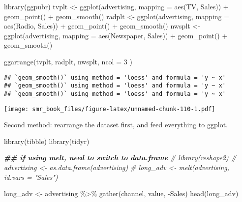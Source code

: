 \documentclass[
  oneside]{book}
\newenvironment{Shaded}{\begin{snugshade}}{\end{snugshade}}
\newcommand{\AttributeTok}[1]{\textcolor[rgb]{0.77,0.63,0.00}{#1}}
\newcommand{\CommentTok}[1]{\textcolor[rgb]{0.56,0.35,0.01}{\textit{#1}}}
\newcommand{\DecValTok}[1]{\textcolor[rgb]{0.00,0.00,0.81}{#1}}
\newcommand{\DocumentationTok}[1]{\textcolor[rgb]{0.56,0.35,0.01}{\textbf{\textit{#1}}}}
\newcommand{\FunctionTok}[1]{\textcolor[rgb]{0.00,0.00,0.00}{#1}}
\newcommand{\NormalTok}[1]{#1}
\newcommand{\OtherTok}[1]{\textcolor[rgb]{0.56,0.35,0.01}{#1}}
\newcommand{\SpecialCharTok}[1]{\textcolor[rgb]{0.00,0.00,0.00}{#1}}
\begin{document}
\begin{Shaded}
\begin{Highlighting}[]
\FunctionTok{library}\NormalTok{(ggpubr)}
\NormalTok{tvplt }\OtherTok{\textless{}{-}} \FunctionTok{ggplot}\NormalTok{(advertising, }\AttributeTok{mapping =} \FunctionTok{aes}\NormalTok{(TV, Sales)) }\SpecialCharTok{+}
  \FunctionTok{geom\_point}\NormalTok{() }\SpecialCharTok{+}
  \FunctionTok{geom\_smooth}\NormalTok{()}
\NormalTok{radplt }\OtherTok{\textless{}{-}} \FunctionTok{ggplot}\NormalTok{(advertising, }\AttributeTok{mapping =} \FunctionTok{aes}\NormalTok{(Radio, Sales)) }\SpecialCharTok{+}
  \FunctionTok{geom\_point}\NormalTok{() }\SpecialCharTok{+}
  \FunctionTok{geom\_smooth}\NormalTok{()}
\NormalTok{nwsplt }\OtherTok{\textless{}{-}} \FunctionTok{ggplot}\NormalTok{(advertising, }\AttributeTok{mapping =} \FunctionTok{aes}\NormalTok{(Newspaper, Sales)) }\SpecialCharTok{+}
  \FunctionTok{geom\_point}\NormalTok{() }\SpecialCharTok{+}
  \FunctionTok{geom\_smooth}\NormalTok{()}

\FunctionTok{ggarrange}\NormalTok{(tvplt, radplt, nwsplt,}
  \AttributeTok{ncol =} \DecValTok{3}
\NormalTok{)}
\end{Highlighting}
\end{Shaded}

\begin{verbatim}
## `geom_smooth()` using method = 'loess' and formula = 'y ~ x'
## `geom_smooth()` using method = 'loess' and formula = 'y ~ x'
## `geom_smooth()` using method = 'loess' and formula = 'y ~ x'
\end{verbatim}

\texttt{[image: smr\_book\_files/figure-latex/unnamed-chunk-110-1.pdf]}

Second method: rearrange the dataset first,
and feed everything to ggplot.

\begin{Shaded}
\begin{Highlighting}[]
\FunctionTok{library}\NormalTok{(tibble)}
\FunctionTok{library}\NormalTok{(tidyr)}

\DocumentationTok{\#\# if using melt, need to switch to data.frame}
\CommentTok{\# library(reshape2)}
\CommentTok{\# advertising \textless{}{-} as.data.frame(advertising)}
\CommentTok{\# long\_adv \textless{}{-} melt(advertising, id.vars = "Sales")}

\NormalTok{long\_adv }\OtherTok{\textless{}{-}}\NormalTok{ advertising }\SpecialCharTok{\%\textgreater{}\%}
  \FunctionTok{gather}\NormalTok{(channel, value, }\SpecialCharTok{{-}}\NormalTok{Sales)}
\FunctionTok{head}\NormalTok{(long\_adv)}
\end{Highlighting}
\end{Shaded}
\end{document}
